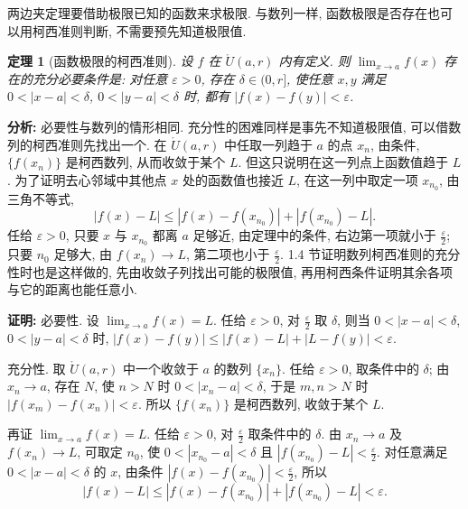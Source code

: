 \documentclass[UTF8,openany]{ctexbook}
\theoremstyle{chinesetextbook}
\newtheorem{theorem}{定理}[section]
\newenvironment{cnproof}{\par\indent\textbf{证明:} \ignorespaces}{\par}
\begin{document}
两边夹定理要借助极限已知的函数来求极限. 与数列一样, 函数极限是否存在也可以用柯西准则判断, 不需要预先知道极限值.
\begin{theorem}[函数极限的柯西准则]
设 $f$ 在 $\mathring U(a,r)$ 内有定义. 则 $\displaystyle\lim_{x\to a}f(x)$ 存在的充分必要条件是: 对任意 $\varepsilon>0$, 存在 $\delta\in(0,r]$, 使任意 $x,y$ 满足 $0<|x-a|<\delta$, $0<|y-a|<\delta$ 时, 都有 $|f(x)-f(y)|<\varepsilon$.
\end{theorem}
\par\indent\textbf{分析:} 必要性与数列的情形相同. 充分性的困难同样是事先不知道极限值, 可以借数列的柯西准则先找出一个. 在 $\mathring U(a,r)$ 中任取一列趋于 $a$ 的点 $x_n$, 由条件, $\{f(x_n)\}$ 是柯西数列, 从而收敛于某个 $L$. 但这只说明在这一列点上函数值趋于 $L$. 为了证明去心邻域中其他点 $x$ 处的函数值也接近 $L$, 在这一列中取定一项 $x_{n_0}$, 由三角不等式,
\[
|f(x)-L|\le|f(x)-f(x_{n_0})|+|f(x_{n_0})-L|.
\]
任给 $\varepsilon>0$, 只要 $x$ 与 $x_{n_0}$ 都离 $a$ 足够近, 由定理中的条件, 右边第一项就小于 $\displaystyle\frac\varepsilon2$; 只要 $n_0$ 足够大, 由 $f(x_n)\to L$, 第二项也小于 $\displaystyle\frac\varepsilon2$. 1.4 节证明数列柯西准则的充分性时也是这样做的, 先由收敛子列找出可能的极限值, 再用柯西条件证明其余各项与它的距离也能任意小.
\begin{cnproof}
必要性. 设 $\displaystyle\lim_{x\to a}f(x)=L$. 任给 $\varepsilon>0$, 对 $\displaystyle\frac\varepsilon2$ 取 $\delta$, 则当 $0<|x-a|<\delta$, $0<|y-a|<\delta$ 时, $|f(x)-f(y)|\le|f(x)-L|+|L-f(y)|<\varepsilon$.

充分性. 取 $\mathring U(a,r)$ 中一个收敛于 $a$ 的数列 $\{x_n\}$. 任给 $\varepsilon>0$, 取条件中的 $\delta$; 由 $x_n\to a$, 存在 $N$, 使 $n>N$ 时 $0<|x_n-a|<\delta$, 于是 $m,n>N$ 时 $|f(x_m)-f(x_n)|<\varepsilon$. 所以 $\{f(x_n)\}$ 是柯西数列, 收敛于某个 $L$.

再证 $\displaystyle\lim_{x\to a}f(x)=L$. 任给 $\varepsilon>0$, 对 $\displaystyle\frac\varepsilon2$ 取条件中的 $\delta$. 由 $x_n\to a$ 及 $f(x_n)\to L$, 可取定 $n_0$, 使 $0<|x_{n_0}-a|<\delta$ 且 $\displaystyle|f(x_{n_0})-L|<\frac\varepsilon2$. 对任意满足 $0<|x-a|<\delta$ 的 $x$, 由条件 $\displaystyle|f(x)-f(x_{n_0})|<\frac\varepsilon2$, 所以
\[
|f(x)-L|\le|f(x)-f(x_{n_0})|+|f(x_{n_0})-L|<\varepsilon.
\]
\end{cnproof}
\end{document}

